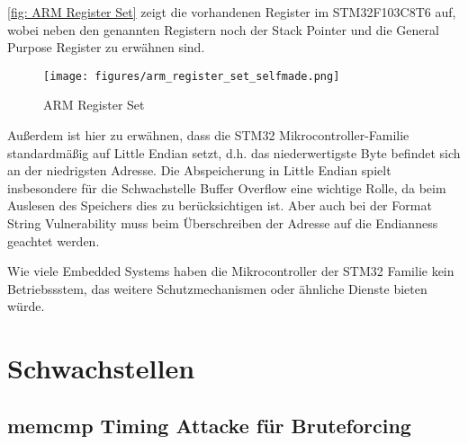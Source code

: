 \documentclass[a4paper,
DIV=13,
12pt,
BCOR=10mm,
department=FakIM,
oneside,
parskip=half,
automark,
listof=totocnumbered,
bibliography=totocnumbered,
acronym=totocnumbered
] {OTHRartcl}
\begin{document}
\autoref{fig: ARM Register Set} zeigt die vorhandenen Register im STM32F103C8T6 auf, wobei neben den genannten Registern noch der Stack Pointer und die General Purpose Register zu erwähnen sind.
\begin{figure}[ht!]
\begin{center}
  \texttt{[image: figures/arm\_register\_set\_selfmade.png]}
  \caption{ARM Register Set}
  \label{fig: ARM Register Set}
\end{center}
\end{figure}

Außerdem ist hier zu erwähnen, dass die STM32 Mikrocontroller-Familie standardmäßig auf Little Endian setzt, d.h. das niederwertigste Byte befindet sich an der niedrigsten Adresse. %
Die Abspeicherung in Little Endian spielt insbesondere für die Schwachstelle Buffer Overflow eine wichtige Rolle, da beim Auslesen des
Speichers dies zu berücksichtigen ist. Aber auch bei der Format String Vulnerability muss beim Überschreiben der Adresse auf die Endianness geachtet werden.

Wie viele Embedded Systems haben die Mikrocontroller der STM32 Familie kein Betriebssstem, das weitere Schutzmechanismen oder ähnliche Dienste bieten würde.

\section{Schwachstellen}
\label{sec:Schwachstellen}
\subsection{memcmp Timing Attacke für Bruteforcing}
\end{document}
